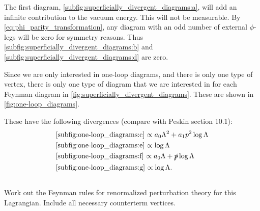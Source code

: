 

The first diagram, \cref{subfig:superficially_divergent_diagrams:a}, will add an infinite contribution to the vacuum energy. This will not be measurable. By \cref{eq:phi_parity_transformation}, any diagram with an odd number of external $\phi$-legs will be zero for symmetry reasons. Thus \cref{subfig:superficially_divergent_diagrams:b} and \cref{subfig:superficially_divergent_diagrams:d} are zero.

Since we are only interested in one-loop diagrams, and there is only one type of vertex, there is only one type of diagram that we are interested in for each Feynman diagram in \cref{fig:superficially_divergent_diagrams}. These are shown in \cref{fig:one-loop_diagrams}.

These have the following divergences (compare with Peskin section 10.1):
\begin{align}
	&\textrm{\cref{subfig:one-loop_diagrams:c} $\propto a_0 \Lambda^2 + a_1 p^2 \log{\Lambda}$}\\
	&\textrm{\cref{subfig:one-loop_diagrams:e} $\propto \log{\Lambda}$} \label{eq:superficially_divergent_phi^4}\\
	&\textrm{\cref{subfig:one-loop_diagrams:f} $\propto a_0 \Lambda + \slashed{p} \log{\Lambda}$}\\
	&\textrm{\cref{subfig:one-loop_diagrams:g} $\propto \log{\Lambda}$.}
\end{align}





\subsection{}
Work out the Feynman rules for renormalized perturbation theory for this Lagrangian. Include all necessary counterterm vertices.

